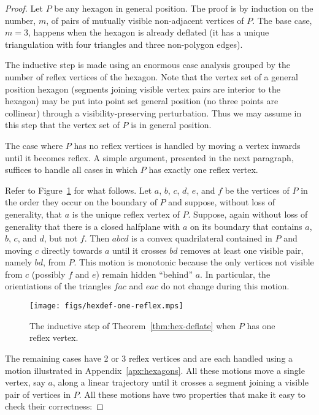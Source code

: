 \documentclass{amsart}
\begin{document}
\begin{proof}
  Let $P$ be any hexagon in general position.  The proof is by
  induction on the number, $m$, of pairs of mutually visible
  non-adjacent vertices of $P$.  The base case, $m=3$, happens when
  the hexagon is already deflated (it has a unique triangulation with
  four triangles and three non-polygon edges).

  The inductive step is made using an enormous case analysis grouped
  by the number of reflex vertices of the hexagon.  Note that the
  vertex set of a general position hexagon (segments joining visible
  vertex pairs are interior to the hexagon) may be put into point set
  general position (no three points are collinear) through a
  visibility-preserving perturbation.  Thus we may assume in this step
  that the vertex set of $P$ is in general position.

  The case where $P$ has no reflex vertices is handled by moving a
  vertex inwards until it becomes reflex.  A simple argument,
  presented in the next paragraph, suffices to handle all cases in
  which $P$ has exactly one reflex vertex.

  Refer to Figure~\ref{fig:hexdef-one-reflex} for what follows.  Let
  $a$, $b$, $c$, $d$, $e$, and $f$ be the vertices of $P$ in the order
  they occur on the boundary of $P$ and suppose, without loss of
  generality, that $a$ is the unique reflex vertex of $P$.  Suppose,
  again without loss of generality that there is a closed halfplane
  with $a$ on its boundary that contains $a$, $b$, $c$, and $d$, but
  not $f$. Then $abcd$ is a convex quadrilateral contained in $P$ and
  moving $c$ directly towards $a$ until it crosses $bd$ removes at
  least one visible pair, namely $bd$, from $P$.  This motion is
  monotonic because the only vertices not visible from $c$ (possibly
  $f$ and $e$) remain hidden ``behind'' $a$.  In particular, the
  orientiations of the triangles $fac$ and $eac$ do not change during
  this motion.

  \begin{figure}[htb]
    \centering
    \texttt{[image: figs/hexdef-one-reflex.mps]}
    \caption{The inductive step of Theorem~\ref{thm:hex-deflate} when $P$ has
      one reflex vertex.}
    \label{fig:hexdef-one-reflex}
  \end{figure}

  The remaining cases have 2 or 3 reflex vertices and are each handled
  using a motion illustrated in Appendix~\ref{apx:hexagons}.  All
  these motions move a single vertex, say $a$, along a linear
  trajectory until it crosses a segment joining a visible pair of
  vertices in $P$.  All these motions have two properties that make it
  easy to check their correctness:


\end{proof}
\end{document}
